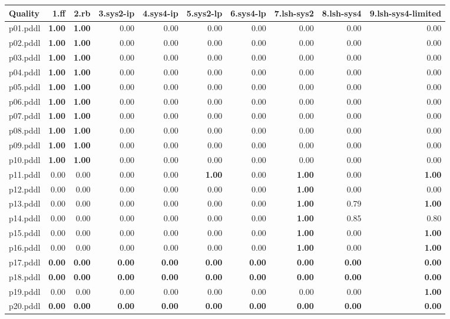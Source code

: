 \documentclass{article}
\begin{document}
\begin{tabular}{@{}lrrrrrrrrr@{}}
Quality & 1.ff & 2.rb & 3.sys2-ip & 4.sys4-ip & 5.sys2-lp & 6.sys4-lp & 7.lsh-sys2 & 8.lsh-sys4 & 9.lsh-sys4-limited \\
\midrule
p01.pddl & \textbf{1.00} & \textbf{1.00} & 0.00 & 0.00 & 0.00 & 0.00 & 0.00 & 0.00 & 0.00 \\
p02.pddl & \textbf{1.00} & \textbf{1.00} & 0.00 & 0.00 & 0.00 & 0.00 & 0.00 & 0.00 & 0.00 \\
p03.pddl & \textbf{1.00} & \textbf{1.00} & 0.00 & 0.00 & 0.00 & 0.00 & 0.00 & 0.00 & 0.00 \\
p04.pddl & \textbf{1.00} & \textbf{1.00} & 0.00 & 0.00 & 0.00 & 0.00 & 0.00 & 0.00 & 0.00 \\
p05.pddl & \textbf{1.00} & \textbf{1.00} & 0.00 & 0.00 & 0.00 & 0.00 & 0.00 & 0.00 & 0.00 \\
p06.pddl & \textbf{1.00} & \textbf{1.00} & 0.00 & 0.00 & 0.00 & 0.00 & 0.00 & 0.00 & 0.00 \\
p07.pddl & \textbf{1.00} & \textbf{1.00} & 0.00 & 0.00 & 0.00 & 0.00 & 0.00 & 0.00 & 0.00 \\
p08.pddl & \textbf{1.00} & \textbf{1.00} & 0.00 & 0.00 & 0.00 & 0.00 & 0.00 & 0.00 & 0.00 \\
p09.pddl & \textbf{1.00} & \textbf{1.00} & 0.00 & 0.00 & 0.00 & 0.00 & 0.00 & 0.00 & 0.00 \\
p10.pddl & \textbf{1.00} & \textbf{1.00} & 0.00 & 0.00 & 0.00 & 0.00 & 0.00 & 0.00 & 0.00 \\
p11.pddl & 0.00 & 0.00 & 0.00 & 0.00 & \textbf{1.00} & 0.00 & \textbf{1.00} & 0.00 & \textbf{1.00} \\
p12.pddl & 0.00 & 0.00 & 0.00 & 0.00 & 0.00 & 0.00 & \textbf{1.00} & 0.00 & 0.00 \\
p13.pddl & 0.00 & 0.00 & 0.00 & 0.00 & 0.00 & 0.00 & \textbf{1.00} & 0.79 & \textbf{1.00} \\
p14.pddl & 0.00 & 0.00 & 0.00 & 0.00 & 0.00 & 0.00 & \textbf{1.00} & 0.85 & 0.80 \\
p15.pddl & 0.00 & 0.00 & 0.00 & 0.00 & 0.00 & 0.00 & \textbf{1.00} & 0.00 & \textbf{1.00} \\
p16.pddl & 0.00 & 0.00 & 0.00 & 0.00 & 0.00 & 0.00 & \textbf{1.00} & 0.00 & \textbf{1.00} \\
p17.pddl & \textbf{0.00} & \textbf{0.00} & \textbf{0.00} & \textbf{0.00} & \textbf{0.00} & \textbf{0.00} & \textbf{0.00} & \textbf{0.00} & \textbf{0.00} \\
p18.pddl & \textbf{0.00} & \textbf{0.00} & \textbf{0.00} & \textbf{0.00} & \textbf{0.00} & \textbf{0.00} & \textbf{0.00} & \textbf{0.00} & \textbf{0.00} \\
p19.pddl & 0.00 & 0.00 & 0.00 & 0.00 & 0.00 & 0.00 & 0.00 & 0.00 & \textbf{1.00} \\
p20.pddl & \textbf{0.00} & \textbf{0.00} & \textbf{0.00} & \textbf{0.00} & \textbf{0.00} & \textbf{0.00} & \textbf{0.00} & \textbf{0.00} & \textbf{0.00} \\
\end{tabular}
\end{document}
